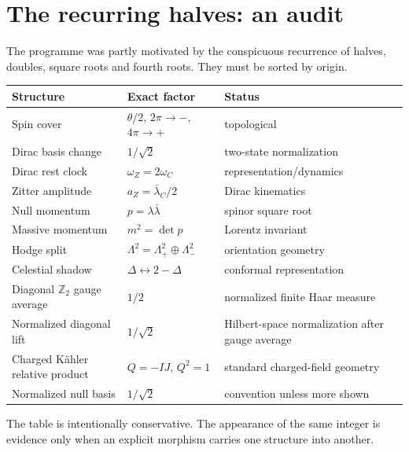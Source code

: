 \documentclass[11pt]{article}
\theoremstyle{definition}\newtheorem{definition}[theorem]{Definition}
\theoremstyle{remark}\newtheorem{remark}[theorem]{Remark}\newtheorem{conjecture}[theorem]{Conjecture}
\begin{document}
\section{The recurring halves: an audit}
The programme was partly motivated by the conspicuous recurrence of halves, doubles, square roots and fourth roots. They must be sorted by origin.
\begin{center}
\begin{tabular}{>{\raggedright\arraybackslash}p{} >{\raggedright\arraybackslash}p{} >{\raggedright\arraybackslash}p{}}
\toprule
Structure & Exact factor & Status\\
\midrule
Spin cover & $\theta/2$, $2\pi\to-$, $4\pi\to+$ & topological\\
Dirac basis change & $1/\sqrt2$ & two-state normalization\\
Dirac rest clock & $\omega_Z=2\omega_C$ & representation/dynamics\\
Zitter amplitude & $a_Z=\bar\lambda_C/2$ & Dirac kinematics\\
Null momentum & $p=\lambda\bar\lambda$ & spinor square root\\
Massive momentum & $m^2=\det p$ & Lorentz invariant\\
Hodge split & $\Lambda^2=\Lambda^2_+\oplus\Lambda^2_-$ & orientation geometry\\
Celestial shadow & $\Delta\leftrightarrow2-\Delta$ & conformal representation\\
Diagonal $\mathbb Z_2$ gauge average & $1/2$ & normalized finite Haar measure\\
Normalized diagonal lift & $1/\sqrt2$ & Hilbert-space normalization after gauge average\\
Charged K\"ahler relative product & $Q=-IJ$, $Q^2=1$ & standard charged-field geometry\\
Normalized null basis & $1/\sqrt2$ & convention unless more shown\\
\bottomrule
\end{tabular}
\end{center}
The table is intentionally conservative. The appearance of the same integer is evidence only when an explicit morphism carries one structure into another.
\end{document}
